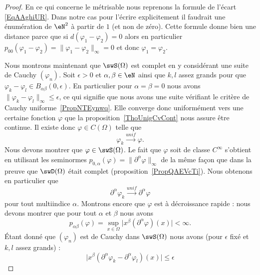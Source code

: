 \begin{proof}
	En ce qui concerne le métrisable nous reprenons la formule de l'écart \eqref{EqAAghiUR}. Dans notre cas pour l'écrire explicitement il faudrait une énumération de \( \eN^2\) à partir de \( 1\) (et non de zéro). Cette formule donne bien une distance parce que si \( d(\varphi_1-\varphi_2)=0\) alors en particulier \( p_{00}(\varphi_1-\varphi_2)=\| \varphi_1-\varphi_2 \|_{\infty}=0\) et donc \( \varphi_1=\varphi_2\).

	Nous montrons maintenant que \( \swS(\Omega)\) est complet en y considérant une suite de Cauchy \( (\varphi_n)\). Soit \( \epsilon>0\) et \( \alpha,\beta\in \eN\) ainsi que \( k,l\) assez grands pour que \( \varphi_k-\varphi_l\in B_{\alpha\beta}(0,\epsilon)\). En particulier pour \( \alpha=\beta=0\) nous avons \( \| \varphi_k-\varphi_l \|_{\infty}\leq \epsilon\), ce qui signifie que nous avons une suite vérifiant le critère de Cauchy uniforme~\ref{PropNTEynwq}. Elle converge donc uniformément vers une certaine fonction \( \varphi\) que la proposition~\ref{ThoUnigCvCont} nous assure être continue. Il existe donc \( \varphi\in C(\Omega)\) telle que
	\begin{equation}
		\varphi_k\stackrel{unif}{\longrightarrow}\varphi.
	\end{equation}
	Nous devons montrer que \( \varphi\in\swS(\Omega)\). Le fait que \( \varphi\) soit de classe \(  C^{\infty}\) s'obtient en utilisant les seminormes \( p_{0,\alpha}(\varphi)=\| \partial^{\alpha}\varphi \|_{\infty}\) de la même façon que dans la preuve que \( \swD(\Omega)\) était complet (proposition~\ref{PropQAEVcTi}). Nous obtenons en particulier que
	\begin{equation}    \label{EqSZyYkqk}
		\partial^{\alpha}\varphi_k\stackrel{unif}{\longrightarrow}\partial^{\alpha}\varphi
	\end{equation}
	pour tout multiindice \( \alpha\). Montrons encore que \( \varphi\) est à décroissance rapide : nous devons montrer que pour tout \( \alpha\) et \( \beta\) nous avons
	\begin{equation}
		p_{\alpha\beta}(\varphi)=\sup_{x\in \Omega}\big| x^{\beta}(\partial^{\alpha}\varphi)(x) \big|<\infty.
	\end{equation}
	Étant donné que \( (\varphi_n)\) est de Cauchy dans \( \swS(\Omega)\) nous avons (pour \( \epsilon\) fixé et \( k,l\) assez grands) :
	\begin{equation}
		\big| x^{\beta}(\partial^{\alpha}\varphi_k-\partial^{\alpha}\varphi_l)(x) \big|\leq \epsilon
	\end{equation}

\end{proof}
